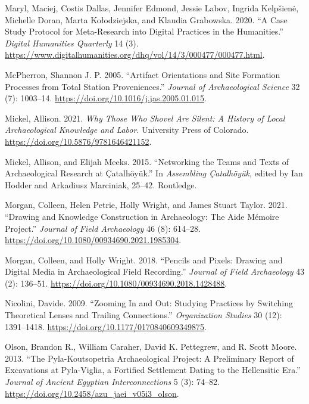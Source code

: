 \documentclass[
]{article}
\newlength{\cslhangindent}
\newenvironment{CSLReferences}[2] %
 {\begin{list}{}{%
  \setlength{\itemindent}{0pt}
  \setlength{\leftmargin}{0pt}
  \setlength{\parsep}{0pt}
  \ifodd #1
   \setlength{\leftmargin}{\cslhangindent}
   \setlength{\itemindent}{-1\cslhangindent}
  \fi
  \setlength{\itemsep}{#2\baselineskip}}}
 {\end{list}}
\begin{document}
\begin{CSLReferences}{1}{0}
Maryl, Maciej, Costis Dallas, Jennifer Edmond, Jessie Labov, Ingrida
Kelpšienė, Michelle Doran, Marta Kołodziejska, and Klaudia Grabowska.
2020. {``A {Case Study Protocol} for {Meta-Research} into {Digital
Practices} in the {Humanities}.''} \emph{Digital Humanities Quarterly}
14 (3).
\url{https://www.digitalhumanities.org/dhq/vol/14/3/000477/000477.html}.

McPherron, Shannon J. P. 2005. {``Artifact Orientations and Site
Formation Processes from Total Station Proveniences.''} \emph{Journal of
Archaeological Science} 32 (7): 1003--14.
\url{https://doi.org/10.1016/j.jas.2005.01.015}.

Mickel, Allison. 2021. \emph{Why {Those Who Shovel Are Silent}: {A
History} of {Local Archaeological Knowledge} and {Labor}}. University
Press of Colorado. \url{https://doi.org/10.5876/9781646421152}.

Mickel, Allison, and Elijah Meeks. 2015. {``Networking the Teams and
Texts of Archaeological Research at {Çatalhöyük}.''} In \emph{Assembling
{Çatalhöyük}}, edited by Ian Hodder and Arkadiusz Marciniak, 25--42.
Routledge.

Morgan, Colleen, Helen Petrie, Holly Wright, and James Stuart Taylor.
2021. {``Drawing and {Knowledge Construction} in {Archaeology}: {The
Aide Mémoire Project}.''} \emph{Journal of Field Archaeology} 46 (8):
614--28. \url{https://doi.org/10.1080/00934690.2021.1985304}.

Morgan, Colleen, and Holly Wright. 2018. {``Pencils and {Pixels}:
{Drawing} and {Digital Media} in {Archaeological Field Recording}.''}
\emph{Journal of Field Archaeology} 43 (2): 136--51.
\url{https://doi.org/10.1080/00934690.2018.1428488}.

Nicolini, Davide. 2009. {``Zooming {In} and {Out}: {Studying Practices}
by {Switching Theoretical Lenses} and {Trailing Connections}.''}
\emph{Organization Studies} 30 (12): 1391--1418.
\url{https://doi.org/10.1177/0170840609349875}.

Olson, Brandon R., William Caraher, David K. Pettegrew, and R. Scott
Moore. 2013. {``The {Pyla-Koutsopetria Archaeological Project}: {A
Preliminary Report} of {Excavations} at {Pyla-Viglia}, a {Fortified
Settlement Dating} to the {Hellensitic Era}.''} \emph{Journal of Ancient
Egyptian Interconnections} 5 (3): 74--82.
\url{https://doi.org/10.2458/azu_jaei_v05i3_olson}.


\end{CSLReferences}
\end{document}
